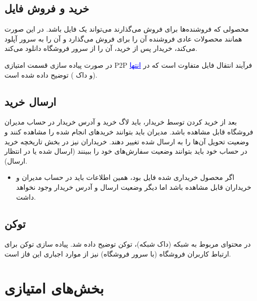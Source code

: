 \documentclass[]{article}
\begin{document}
\subsection*{{\titr خرید و فروش فایل}}

محصولی که فروشنده‌ها برای فروش می‌گذارند می‌تواند یک فایل باشد. در این صورت همانند محصولات عادی فروشنده آن را برای فروش می‌گذارد و آن را به سرور آپلود می‌کند، خریدار پس از خرید، آن را از سرور فروشگاه دانلود می‌کند.
 

 
در صورت پیاده سازی قسمت امتیازی P2P فرآیند انتقال فایل متفاوت است که در  \hyperref[subsec:p2p]{{\textcolor{blue}{\underline{انتها}}}} (\textcolor{CustomColor}{و داک }) توضیح داده شده است.

\subsection*{{\titr ارسال خرید}}

بعد از خرید کردن توسط خریدار، باید لاگ خرید و آدرس خریدار در حساب مدیران فروشگاه قابل مشاهده باشد. مدیران باید بتوانند خرید‌های انجام شده را مشاهده کنند و وضعیت تحویل آن‌ها را به ارسال شده تغییر دهند. خریداران نیز در بخش تاریخچه خرید در حساب خود باید بتوانند وضعیت سفارش‌های خود را ببینند (‌ارسال شده یا در انتظار ارسال).

\begin{itemize}
\item
اگر محصول خریداری شده فایل بود، همین اطلاعات باید در حساب مدیران و خریداران قابل مشاهده باشد اما دیگر وضعیت ارسال و آدرس خریدار وجود نخواهد داشت.
\end{itemize}

\subsection*{{\titr توکن}}

در محتوای مربوط به شبکه (داک شبکه)، توکن توضیح داده شد. پیاده سازی توکن برای ارتباط کاربران فروشگاه (‌با سرور فروشگاه)‌ نیز از موارد اجباری این فاز است.


\newpage

\section*{{\titr بخش‌های امتیازی}}
\end{document}
